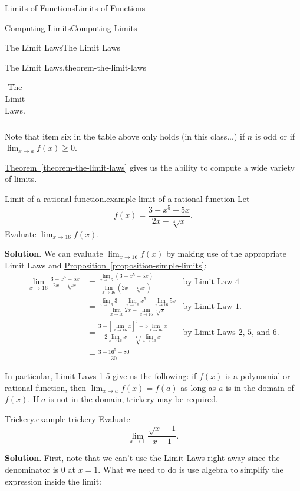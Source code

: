 \documentclass[10pt,]{book}
\numberwithin{equation}{section}
\begin{document}
\begin{chapterptx}{Limits of Functions}{}{Limits of Functions}{}{}
\begin{sectionptx}{Computing Limits}{}{Computing Limits}{}{}
\begin{subsectionptx}{The Limit Laws}{}{The Limit Laws}{}{}
\begin{theorem}{The Limit Laws.}{}{theorem-the-limit-laws}
\begin{table}
\begin{tabular}{ll}
\end{tabular}
\caption{The Limit Laws.\label{table-limit-laws}}
\end{table}
\hypertarget{p-23}{}%
Note that item six in the table above only holds (in this class...) if \(n\) is odd or if \(\lim_{x\to a}f(x)\geq0\).%
\end{theorem}
\hypertarget{p-24}{}%
\hyperref[theorem-the-limit-laws]{Theorem~\ref{theorem-the-limit-laws}} gives us the ability to compute a wide variety of limits.%
\begin{example}{Limit of a rational function.}{example-limit-of-a-rational-function}%
\hypertarget{p-25}{}%
Let%
\begin{equation*}
f(x) = \frac{3 - x^{5} + 5x}{2x-\sqrt[4]{x}}.
\end{equation*}
Evaluate \(\lim_{x\to 16}f(x)\).%
\par\smallskip%
\noindent\textbf{Solution}.\hypertarget{solution-4}{}\quad%
\hypertarget{p-26}{}%
We can evaluate \(\lim_{x\to 16}f(x)\) by making use of the appropriate Limit Laws and \hyperref[proposition-simple-limits]{Proposition~\ref{proposition-simple-limits}}:%
%
\begin{align*}
\lim_{x\to 16}\frac{3 - x^{5} + 5x}{2x-\sqrt[4]{x}} & = \frac{\lim_{x\to 16}(3 - x^{5} + 5x)}{\lim_{x\to 16}(2x-\sqrt[4]{x})} & \text{by Limit Law 4}\\
& = \frac{\lim_{x\to 16}3 - \lim_{x\to 16}x^{5} + \lim_{x\to 16}5x}{\lim_{x\to 16}2x-\lim_{x\to 16}\sqrt[4]{x}} & \text{by Limit Law 1.} \\
& = \frac{3 - [\lim_{x\to 16}x]^{5} + 5\lim_{x\to 16}x}{2\lim_{x\to 16}x-\sqrt[4]{\lim_{x\to 16}x}} & \text{by Limit Laws 2, 5, and 6.} \\
& = \frac{3-16^{5}+80}{30} &
\end{align*}
\end{example}
\hypertarget{p-27}{}%
In particular, Limit Laws 1-5 give us the following: if \(f(x)\) is a polynomial or rational function, then \(\lim_{x\to a}f(x) = f(a)\) as long as \(a\) is in the domain of \(f(x)\). If \(a\) is not in the domain, trickery may be required.%
\begin{example}{Trickery.}{example-trickery}%
\hypertarget{p-28}{}%
Evaluate%
\begin{equation*}
\lim_{x\to1}\frac{\sqrt{x}-1}{x-1}.
\end{equation*}
%
\par\smallskip%
\noindent\textbf{Solution}.\hypertarget{solution-5}{}\quad%
\hypertarget{p-29}{}%
First, note that we can't use the Limit Laws right away since the denominator is \(0\) at \(x=1\). What we need to do is use algebra to simplify the expression inside the limit:%

\end{example}
\end{subsectionptx}
\end{sectionptx}
\end{chapterptx}
\end{document}
